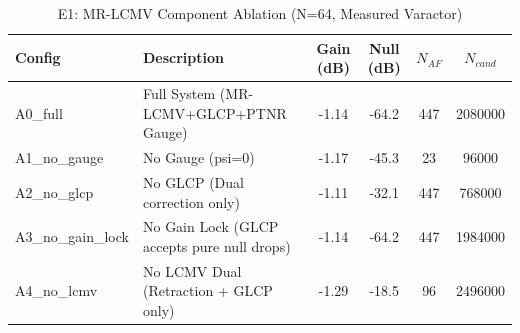 \begin{table}[h]
\centering
\caption{E1: MR-LCMV Component Ablation (N=64, Measured Varactor)}
\begin{tabular}{llcccc}
\toprule
Config & Description & Gain (dB) & Null (dB) & $N_{AF}$ & $N_{cand}$ \\
\midrule
A0\_full & Full System (MR-LCMV+GLCP+PTNR Gauge) & -1.14 & -64.2 & 447 & 2080000 \\
A1\_no\_gauge & No Gauge (psi=0) & -1.17 & -45.3 & 23 & 96000 \\
A2\_no\_glcp & No GLCP (Dual correction only) & -1.11 & -32.1 & 447 & 768000 \\
A3\_no\_gain\_lock & No Gain Lock (GLCP accepts pure null drops) & -1.14 & -64.2 & 447 & 1984000 \\
A4\_no\_lcmv & No LCMV Dual (Retraction + GLCP only) & -1.29 & -18.5 & 96 & 2496000 \\
\bottomrule
\end{tabular}
\end{table}
